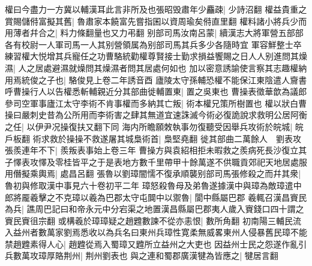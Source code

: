 權曰今盡力一方冀以輔漢耳此言非所及也張昭毁肅年少麤疎|{
	少詩沼翻}
權益貴重之賞賜儲偫富擬其舊|{
	魯肅家本饒富先嘗指囷以資周瑜矣偫直里翻}
權料諸小將兵少而用薄者幷合之|{
	料力條翻量也又力弔翻}
别部司馬汝南呂蒙|{
	續漢志大將軍營五部部各有校尉一人軍司馬一人其别營領属為别部司馬其兵多少各隨時宜}
軍容鮮整士卒練習權大悦增其兵寵任之功曹駱統勸權尊賢接士勤求損益饗賜之日人人别進問其燥濕|{
	人之居處避濕就燥問其燥濕者問其居處何如也}
加以密意誘諭使言察其志趣權納用焉統俊之子也|{
	駱俊見上卷二年誘音酉}
廬陵太守孫輔恐權不能保江東陰遣人齎書呼曹操行人以告權悉斬輔親近分其部曲徙輔置東|{
	置之吳東也}
曹操表徵華歆為議郎參司空軍事廬江太守李術不肯事權而多納其亡叛|{
	術本權兄策所樹置也}
權以狀白曹操曰嚴刺史昔為公所用而李術害之肆其無道宜速誅滅今術必復詭說求救明公居阿衡之任|{
	以伊尹况操復扶又翻下同}
海内所瞻願敇執事勿復聽受因舉兵攻術於皖城|{
	皖戶板翻}
術求救於操操不救遂屠其城梟術首|{
	梟堅堯翻}
徙其部曲二萬餘人　劉表攻張羨連年不下|{
	羨叛表事始上卷三年}
曹操方與袁紹相拒未暇救之羨病死長沙復立其子懌表攻懌及零桂皆平之于是表地方數千里帶甲十餘萬遂不供職貢郊祀天地居處服用僭擬乘輿焉|{
	處昌呂翻}
張魯以劉璋闇懦不復承順襲别部司馬張修殺之而幷其衆|{
	魯初與修取漢中事見六十卷初平二年}
璋怒殺魯母及弟魯遂據漢中與璋為敵璋遣中郎將龎羲擊之不克璋以羲為巴郡太守屯䦘中以禦魯|{
	閬中縣屬巴郡}
羲輒召漢昌賨民為兵|{
	譙周巴記曰和帝永元中分宕渠之地置漢昌縣屬巴郡夷人歲入賨錢口四十謂之賨民賨徂宗翻}
或構羲於璋璋疑之趙韙數諫不從亦恚恨|{
	數所角翻}
初南陽三輔民流入益州者數萬家劉焉悉收以為兵名曰東州兵璋性寛柔無威畧東州人侵暴舊民璋不能禁趙韙素得人心|{
	趙韙從焉入蜀璋又韙所立益州之大吏也}
因益州士民之怨遂作亂引兵數萬攻璋厚賂荆州|{
	荆州劉表也}
與之連和蜀郡廣漢犍為皆應之|{
	犍居言翻}


